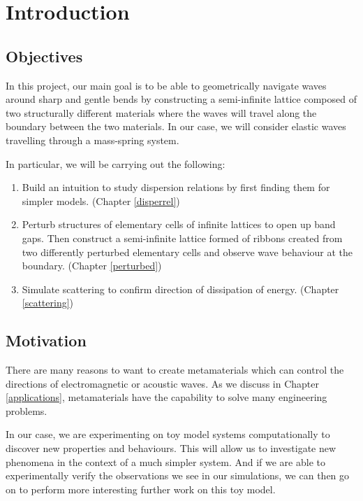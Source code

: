 \chapter{Introduction}

\section{Objectives}
In this project, our main goal is to be able to geometrically navigate waves
around sharp and gentle bends by constructing a semi-infinite lattice composed
of two structurally different materials where the waves will travel along the
boundary between the two materials. In our case, we will consider elastic waves
travelling through a mass-spring system.

In particular, we will be carrying out the following:

\begin{enumerate}
\item Build an intuition to study dispersion relations by first finding them
      for simpler models. (Chapter \ref{disperrel})
\item Perturb structures of elementary cells of infinite lattices to open up
      band gaps. Then construct a semi-infinite lattice formed of ribbons
      created from two differently perturbed elementary cells and observe wave
      behaviour at the boundary. (Chapter \ref{perturbed})
\item Simulate scattering to confirm direction of dissipation of energy.
      (Chapter \ref{scattering})
\end{enumerate}

\section{Motivation}
There are many reasons to want to create metamaterials which can control the
directions of electromagnetic or acoustic waves. As we discuss in Chapter
\ref{applications}, metamaterials have the capability to solve many engineering
problems.

In our case, we are experimenting on toy model systems computationally to
discover new properties and behaviours. This will allow us to investigate new
phenomena in the context of a much simpler system. And if we are able to
experimentally verify the observations we see in our simulations, we can then
go on to perform more interesting further work on this toy model.
